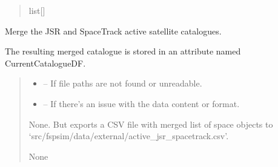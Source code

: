 \documentclass[letterpaper,10pt,english]{sphinxmanual}
\begin{document}
\begin{fulllineitems}
\begin{fulllineitems}
\begin{quote}
\begin{description}
\sphinxAtStartPar
list{[}{\hyperref[\detokenize{fspsim.utils:fspsim.utils.SpaceObject.SpaceObject}]{}}{]}

\end{description}\end{quote}

\end{fulllineitems}


\begin{fulllineitems}
\label{\detokenize{fspsim.utils:fspsim.utils.SpaceCatalogue.SpaceCatalogue.CreateCatalogueActive}}
\pysigstartsignatures
{}
\pysigstopsignatures
\sphinxAtStartPar
Merge the JSR and SpaceTrack active satellite catalogues.

\sphinxAtStartPar
The resulting merged catalogue is stored in an attribute named CurrentCatalogueDF.
\begin{quote}\begin{description}
\begin{itemize}
\item {} 
\sphinxAtStartPar
{} – If file paths are not found or unreadable.

\item {} 
\sphinxAtStartPar
{} – If there’s an issue with the data content or format.

\end{itemize}

\sphinxAtStartPar
None. But exports a CSV file with merged list of space objects to ‘src/fspsim/data/external/active\_jsr\_spacetrack.csv’.

\sphinxAtStartPar
None

\end{description}\end{quote}

\end{fulllineitems}



\end{fulllineitems}
\end{document}
